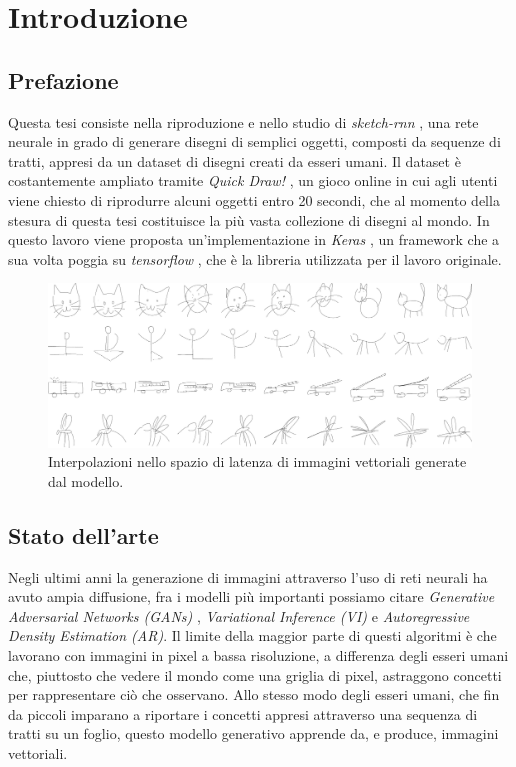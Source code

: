 \chapter{Introduzione}
\section{Prefazione}
Questa tesi consiste nella riproduzione e nello studio di \textit{sketch-rnn} \cite{sketchrnn}, una rete neurale in grado di generare disegni di semplici oggetti, composti da sequenze di tratti, appresi da un dataset di disegni creati da esseri umani. Il dataset è costantemente ampliato tramite \textit{Quick Draw!} \cite{quickdraw}, un gioco online in cui agli utenti viene chiesto di riprodurre alcuni oggetti entro 20 secondi, che al momento della stesura di questa tesi costituisce la più vasta collezione di disegni al mondo. In questo lavoro viene proposta un'implementazione in \textit{Keras} \cite{keras}, un framework che a sua volta poggia su \textit{tensorflow} \cite{tensorflow}, che è la libreria utilizzata per il lavoro originale.
\begin{figure}[h]
	\centering
	\includegraphics[width=\linewidth]{img/sketch_rnn_latent.png}
	\caption{Interpolazioni nello spazio di latenza di immagini vettoriali generate dal modello.}
	\label{fig:1.1}
\end{figure}
\section{Stato dell'arte}
Negli ultimi anni la generazione di immagini attraverso l'uso di reti neurali ha avuto ampia diffusione, fra i modelli più importanti possiamo citare \textit{Generative Adversarial Networks (GANs)} \cite{GAN}, \textit{Variational Inference (VI)} \cite{VI} e \textit{Autoregressive Density Estimation (AR)}. \cite{AR} Il limite della maggior parte di questi algoritmi è che lavorano con immagini in pixel a bassa risoluzione, a differenza degli esseri umani che, piuttosto che vedere il mondo come una griglia di pixel, astraggono concetti per rappresentare ciò che osservano. Allo stesso modo degli esseri umani, che fin da piccoli imparano a riportare i concetti appresi attraverso una sequenza di tratti su un foglio, questo modello generativo apprende da, e produce, immagini vettoriali.

